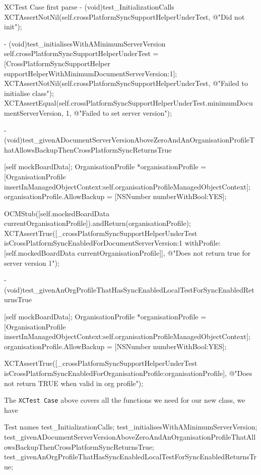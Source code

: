\documentclass[a4paper, titlepage]{article}
\begin{document}
  \begin{listbox}{1}{XCTest Case first parse}
      - (void)test_InitializationCalls
      {
          XCTAssertNotNil(self.crossPlatformSyncSupportHelperUnderTest, @"Did not init");
      }

      - (void)test_initialisesWithAMinimumServerVersion
      {
          self.crossPlatformSyncSupportHelperUnderTest = [CrossPlatformSyncSupportHelper supportHelperWithMinimumDocumentServerVersion:1];
          XCTAssertNotNil(self.crossPlatformSyncSupportHelperUnderTest, @"Failed to initialise class");
          XCTAssertEqual(self.crossPlatformSyncSupportHelperUnderTest.minimumDocumentServerVersion, 1, @"Failed to set server version");
      }

      - (void)test_givenADocumentServerVersionAboveZeroAndAnOrganisationProfileThatAllowsBackupThenCrossPlatformSyncReturnsTrue
      {
          [self mockBoardData];
          OrganisationProfile *organisationProfile = [OrganisationProfile insertInManagedObjectContext:self.organisationProfileManagedObjectContext];
          organisationProfile.AllowBackup = [NSNumber numberWithBool:YES];

          OCMStub([self.mockedBoardData currentOrganisationProfile]).andReturn(organisationProfile);
          XCTAssertTrue([_crossPlatformSyncSupportHelperUnderTest
          isCrossPlatformSyncEnabledForDocumentServerVersion:1
          withProfile: [self.mockedBoardData currentOrganisationProfile]], @"Does not return true for server version 1");
      }

      - (void)test_givenAnOrgProfileThatHasSyncEnabledLocalTestForSyncEnabledReturnsTrue
      {
          [self mockBoardData];
          OrganisationProfile *organisationProfile = [OrganisationProfile insertInManagedObjectContext:self.organisationProfileManagedObjectContext];
          organisationProfile.AllowBackup = [NSNumber numberWithBool:YES];

          XCTAssertTrue([_crossPlatformSyncSupportHelperUnderTest isCrossPlatformSyncEnabledForOrganisationProfile:organisationProfile], @"Does not return TRUE when valid in org profile");
      }
  \end{listbox}

  
The \texttt{XCTest Case} above covers all the functions we
  need for our new class, we have
  
   \begin{listbox}{1}{Test names}
       test_InitializationCalls;
       test_initialisesWithAMinimumServerVersion;
       test_givenADocumentServerVersionAboveZeroAndAnOrganisationProfileThatAllowsBackupThenCrossPlatformSyncReturnsTrue;
      test_givenAnOrgProfileThatHasSyncEnabledLocalTestForSyncEnabledReturnsTrue;
  \end{listbox}
\end{document}
